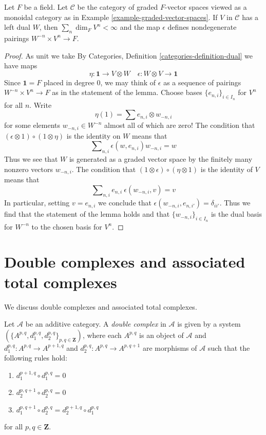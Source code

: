 \begin{lemma}
\label{lemma-left-dual-graded-vector-spaces}
Let $F$ be a field. Let $\mathcal{C}$ be the category of graded
$F$-vector spaces viewed as a monoidal category as in
Example \ref{example-graded-vector-spaces}. If $V$ in $\mathcal{C}$
has a left dual $W$, then $\sum_n \dim_F V^n < \infty$
and the map $\epsilon$ defines nondegenerate pairings
$W^{-n} \times V^n \to F$.
\end{lemma}

\begin{proof}
As unit we take
By Categories, Definition \ref{categories-definition-dual} we have
maps
$$
\eta : \mathbf{1} \to V \otimes W\quad
\epsilon : W \otimes V \to \mathbf{1}
$$
Since $\mathbf{1} = F$ placed in degree $0$, we
may think of $\epsilon$ as a sequence of pairings
$W^{-n} \times V^n \to F$ as in the statement of the lemma.
Choose bases $\{e_{n, i}\}_{i \in I_n}$ for $V^n$ for all $n$.
Write
$$
\eta(1) = \sum e_{n, i} \otimes w_{-n, i}
$$
for some elements $w_{-n, i} \in W^{-n}$ almost all of which are zero!
The condition that $(\epsilon \otimes 1) \circ (1 \otimes \eta)$ is the
identity on $W$ means that
$$
\sum\nolimits_{n, i} \epsilon(w, e_{n, i})w_{-n, i} = w
$$
Thus we see that $W$ is generated as a graded vector space
by the finitely many nonzero vectors $w_{-n, i}$.
The condition that $(1 \otimes \epsilon) \circ (\eta \otimes 1)$
is the identity of $V$ means that
$$
\sum\nolimits_{n, i} e_{n, i}\ \epsilon(w_{-n, i}, v) = v
$$
In particular, setting $v = e_{n, i}$ we conclude that
$\epsilon(w_{-n, i}, e_{n, i'}) = \delta_{ii'}$. Thus
we find that the statement of the lemma holds and that
$\{w_{-n, i}\}_{i \in I_n}$ is the dual basis for $W^{-n}$ to
the chosen basis for $V^n$.
\end{proof}






\section{Double complexes and associated total complexes}
\label{section-double-complexes}

\noindent
We discuss double complexes and associated total complexes.

\begin{definition}
\label{definition-double-complex}
Let $\mathcal{A}$ be an additive category.
A {\it double complex} in $\mathcal{A}$ is given
by a system $(\{A^{p, q}, d_1^{p, q}, d_2^{p, q}\}_{p, q\in \mathbf{Z}})$,
where each $A^{p, q}$ is an object of $\mathcal{A}$ and
$d_1^{p, q} : A^{p, q} \to A^{p + 1, q}$ and
$d_2^{p, q} : A^{p, q} \to A^{p, q + 1}$ are morphisms of $\mathcal{A}$
such that the following rules hold:
\begin{enumerate}
\item $d_1^{p + 1, q} \circ d_1^{p, q} = 0$
\item $d_2^{p, q + 1} \circ d_2^{p, q} = 0$
\item $d_1^{p, q + 1} \circ d_2^{p, q} = d_2^{p + 1, q} \circ d_1^{p, q}$
\end{enumerate}
for all $p, q \in \mathbf{Z}$.
\end{definition}

